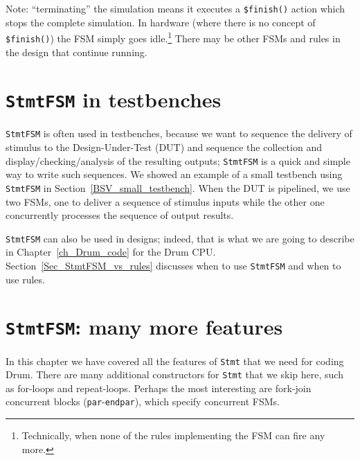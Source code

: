 Note: ``terminating'' the simulation means it executes a
\verb|$finish()| action which stops the complete simulation.  In
hardware (where there is no concept of \verb|$finish()|) the FSM
simply goes idle.\footnote{Technically, when none of the rules implementing
the FSM can fire any more.}  There may be other FSMs and rules in the
design that continue running.


\section{{\tt StmtFSM} in testbenches}

\label{Sec_StmtFSM_in_testbenches}


\verb|StmtFSM| is often used in testbenches, because we want to
sequence the delivery of stimulus to the Design-Under-Test (DUT) and
sequence the collection and display/checking/analysis of the resulting
outputs; \verb|StmtFSM| is a quick and simple way to write such
sequences.  We showed an example of a small testbench using
\verb|StmtFSM| in Section~\ref{BSV_small_testbench}.  When the DUT is
pipelined, we use two FSMs, one to deliver a sequence of stimulus
inputs while the other one concurrently processes the sequence of
output results.

\verb|StmtFSM| can also be used in designs; indeed, that is what we
are going to describe in Chapter~\ref{ch_Drum_code} for the Drum CPU.
Section~\ref{Sec_StmtFSM_vs_rules} discusses when to use
\verb|StmtFSM| and when to use rules.


\section{{\tt StmtFSM}: many more features}

\label{Sec_StmtFSM_more_features}


In this chapter we have covered all the features of \verb|Stmt| that
we need for coding Drum.  There are many additional constructors for
\verb|Stmt| that we skip here, such as for-loops and repeat-loops.
Perhaps the most interesting are fork-join concurrent blocks
(\verb|par|-\verb|endpar|), which specify concurrent FSMs.

